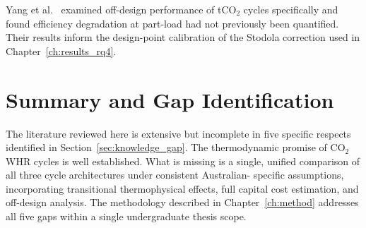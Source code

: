 Yang et al.~\cite{Yang2024} examined off-design performance of tCO$_2$
cycles specifically and found efficiency degradation at part-load had not
previously been quantified. Their results inform the design-point calibration
of the Stodola correction used in Chapter~\ref{ch:results_rq4}.

\section{Summary and Gap Identification}
\label{sec:lit_summary}

The literature reviewed here is extensive but incomplete in five specific
respects identified in Section~\ref{sec:knowledge_gap}. The thermodynamic
promise of CO$_2$ WHR cycles is well established. What is missing is a single,
unified comparison of all three cycle architectures under consistent Australian-
specific assumptions, incorporating transitional thermophysical effects, full
capital cost estimation, and off-design analysis. The methodology described in
Chapter~\ref{ch:method} addresses all five gaps within a single undergraduate
thesis scope.

